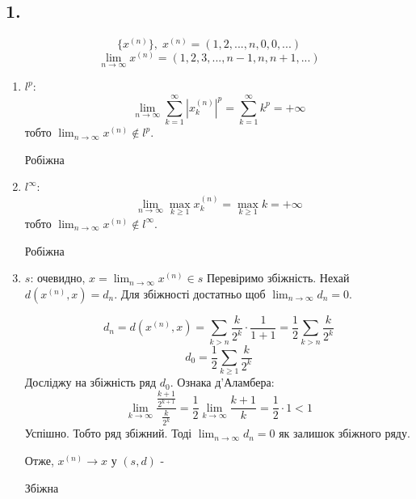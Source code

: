 \documentclass[11pt, a4paper]{article} %
\begin{document}
\subsection*{1.}
\begin{mdframed}
    \[\{x^{(n)}\}, \; x^{(n)} = (1,2,...,n,0,0,...)\]
    \[\lim_{n\to\infty} x^{(n)} = (1,2,3,...,n-1,n,n+1,...)\]
\end{mdframed}
\begin{enumerate}
    \item $l^p$: \[\lim_{n\to\infty} \sum_{k=1}^\infty |x^{(n)}_k|^p = \sum_{k=1}^\infty k^p = +\infty\]
    тобто $\lim_{n\to\infty} x^{(n)} \notin l^p$. \begin{mdframed}[backgroundcolor=red!20]
    Робіжна
    \end{mdframed}

    \item $l^\infty$: \[\lim_{n\to\infty} \max_{k\ge1} x^{(n)}_k = \max_{k\ge1} k  = +\infty\]
    тобто $\lim_{n\to\infty} x^{(n)} \notin l^\infty$. \begin{mdframed}[backgroundcolor=red!20]
    Робіжна
    \end{mdframed}

    \item $s$: очевидно, $x = \lim_{n\to\infty} x^{(n)} \in s$
    Перевіримо збіжність. Нехай $d(x^{(n)}, x) = d_n$. Для збіжності достатньо щоб $\lim_{n\to\infty} d_n = 0$.
    
    \[d_n = d(x^{(n)}, x) = \sum_{k > n} \frac{k}{2^k} \cdot \frac{1}{1+1} = \frac{1}{2} \sum_{k > n} \frac{k}{2^k}\]
    \[d_0 = \frac{1}{2} \sum_{k \ge 1} \frac{k}{2^k} \]
    Досліджу на збіжність ряд $d_0$. Ознака д'Аламбера:
    \[\lim_{k\to\infty} \frac{\frac{k+1}{2^{k+1}}}{\frac{k}{2^k}} = \frac{1}{2}\lim_{k\to\infty} \frac{k+1}{k} = \frac{1}{2} \cdot 1 < 1\]
    Успішно. Тобто ряд збіжний. Тоді $\lim_{n\to\infty} d_n =0$ як залишок збіжного ряду.

    Отже, $x^{(n)} \to x$ у $(s,d)$ - \begin{mdframed}[style=ans]
    Збіжна
    \end{mdframed}
\end{enumerate}
\end{document}
